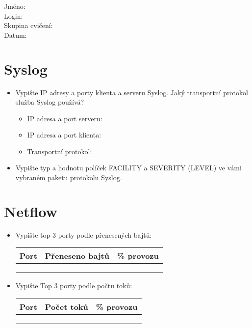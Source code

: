 Jméno:\\
Login:\\
Skupina cvičení:\\
Datum:\\

\section{Syslog}

\begin{itemize}
    \item Vypište IP adresy a porty klienta a serveru Syslog. Jaký transportní protokol služba Syslog používá?
    \begin{itemize}
        \item IP adresa a port serveru:
        \item IP adresa a port klienta:
        \item Transportní protokol: 
    \end{itemize}
    \item Vypište typ a hodnotu políček FACILITY a SEVERITY (LEVEL) ve vámi vybraném paketu protokolu Syslog.
    \vspace{2cm}
\end{itemize}

\section{Netflow}

\begin{itemize} 
\item Vypište top 3 porty podle přenesených bajtů: 

\begin{tabular}{|p{2cm}|p{3cm}|p{3cm}|}
\hline
Port  & Přeneseno bajtů  & \% provozu \\ \hline
      &                  &        \\   \hline
      &                  &         \\  \hline
      &                  &        \\   \hline
\end{tabular}

\item Vypište Top 3 porty podle počtu toků: 

\begin{tabular}{|p{2cm}|p{3cm}|p{3cm}|}
\hline
Port  & Počet toků  & \% provozu \\ \hline
      &                  &        \\   \hline
      &                  &         \\  \hline
      &                  &         \\  \hline
\end{tabular}
\end{itemize}

